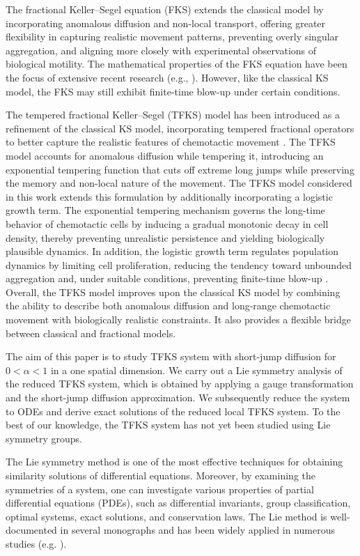 \documentclass{article}
\begin{document}
The fractional Keller--Segel equation (FKS) extends the classical model by incorporating anomalous diffusion and non-local transport, offering greater flexibility in capturing realistic movement patterns, preventing overly singular aggregation, and aligning more closely with experimental observations of biological motility. The mathematical properties of the FKS equation have been the focus of extensive recent research (e.g., \cite{Chen2025,Gao2025,Kumar2017}). However, like the classical KS model, the FKS may still exhibit finite-time blow-up under certain conditions.
\par 
The tempered fractional Keller--Segel (TFKS) model has been introduced as a refinement of the classical KS model, incorporating tempered fractional operators to better capture the realistic features of chemotactic movement \cite{Zhang2023, Zhang2024}. The TFKS model accounts for anomalous diffusion while tempering it, introducing an exponential tempering function that cuts off extreme long jumps while preserving the memory and non-local nature of the movement. The TFKS model considered in this work extends this formulation by additionally incorporating a logistic growth term. The exponential tempering mechanism governs the long-time behavior of chemotactic cells by inducing a gradual monotonic decay in cell density, thereby preventing unrealistic persistence and yielding biologically plausible dynamics. In addition, the logistic growth term regulates population dynamics by limiting cell proliferation, reducing the tendency toward unbounded aggregation and, under suitable conditions, preventing finite-time blow-up \cite{Zhuang2019}. Overall, the TFKS model improves upon the classical KS model by combining the ability to describe both anomalous diffusion and long-range chemotactic movement with biologically realistic constraints. It also provides a flexible bridge between classical and fractional models.

\par 
The aim of this paper is to study TFKS system with short-jump diffusion for $0<\alpha< 1$ in a one spatial dimension. We carry out a Lie symmetry analysis of the reduced TFKS system, which is obtained by applying a gauge transformation and the short-jump diffusion approximation. We subsequently reduce the system to ODEs and derive exact solutions of the reduced local TFKS system. To the best of our knowledge, the TFKS system has not yet been studied using Lie symmetry groups.



\par 
The Lie symmetry method is one of the most effective techniques for obtaining similarity solutions of
differential equations. Moreover, by examining the symmetries of a system, one can investigate various properties
of partial differential equations (PDEs), such as differential invariants, group classification, optimal systems,
exact solutions, and conservation laws. The Lie method is well-documented in several monographs \cite{bluman2010applications,olver2000applications} and has been widely applied in numerous studies (e.g. \cite{Bazghandi2019,Haghighatdoost2023,Haghighatdoost2025,lashkarian2017}). 
\end{document}
